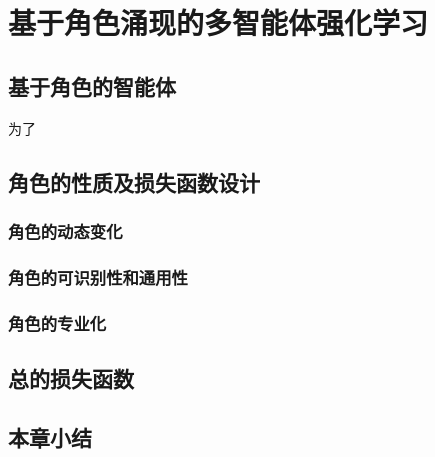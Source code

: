 
\chapter{基于角色涌现的多智能体强化学习}
\section{基于角色的智能体}
为了

\section{角色的性质及损失函数设计}
\subsection{角色的动态变化}

\subsection{角色的可识别性和通用性}

\subsection{角色的专业化}

\section{总的损失函数}

\section{本章小结}

